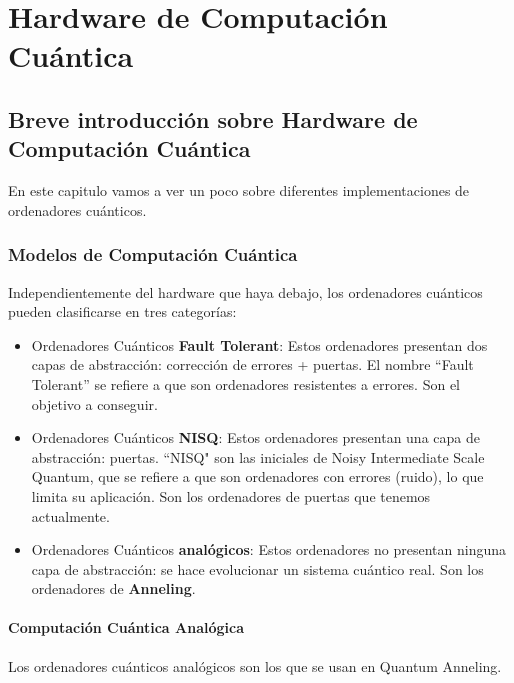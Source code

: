 
\part{Hardware de Computación Cuántica}




\chapter{Breve introducción sobre Hardware de Computación Cuántica}

En este capitulo vamos a ver un poco sobre diferentes implementaciones de ordenadores cuánticos.

\section{Modelos de Computación Cuántica}

Independientemente del hardware que haya debajo, los ordenadores cuánticos pueden clasificarse en tres categorías:
\begin{itemize}
	\item Ordenadores Cuánticos \textbf{Fault Tolerant}: Estos ordenadores presentan dos capas de abstracción: corrección de errores + puertas. El nombre ``Fault Tolerant'' se refiere a que son ordenadores resistentes a errores. Son el objetivo a conseguir.
	\item Ordenadores Cuánticos \textbf{NISQ}: Estos ordenadores presentan una capa de abstracción: puertas. ``NISQ" son las iniciales de Noisy Intermediate Scale Quantum, que se refiere a que son ordenadores con errores (ruido), lo que limita su aplicación. Son los ordenadores de puertas que tenemos actualmente.
	\item Ordenadores Cuánticos \textbf{analógicos}: Estos ordenadores no presentan ninguna capa de abstracción: se hace evolucionar un sistema cuántico real. Son los ordenadores de \textbf{Anneling}.
\end{itemize}



\subsection{Computación Cuántica Analógica}

Los ordenadores cuánticos analógicos son los que se usan en Quantum Anneling.

